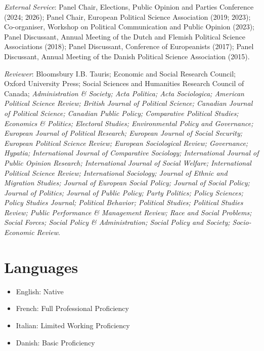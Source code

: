 \documentclass[letterpaper,fontsize=10.5pt]{scrartcl}
\begin{document}
\hfill \break
{}
{}\textit{External Service}: Panel Chair, Elections, Public Opinion and Parties Conference (2024; 2026); Panel Chair, European Political Science Association (2019; 2023); Co-organiser, Workshop on Political Communication and Public Opinion (2023); Panel Discussant, Annual Meeting of the Dutch and Flemish Political Science Associations (2018); Panel Discussant, Conference of Europeanists (2017); Panel Discussant, Annual Meeting of the Danish Political Science Association (2015).\\
\hfill \break
{}
{}\textit{Reviewer}: Bloomsbury I.B. Tauris; Economic and Social Research Council; Oxford University Press; Social Sciences and Humanities Research Council of Canada; \textit{Administration \& Society; Acta Politica; Acta Sociologica; American Political Science Review; British Journal of Political Science; Canadian Journal of Political Science; Canadian Public Policy; Comparative Political Studies; Economics \& Politics; Electoral Studies; Environmental Policy and Governance; European Journal of Political Research; European Journal of Social Security; European Political Science Review; European Sociological Review; Governance; Hypatia; International Journal of Comparative Sociology; International Journal of Public Opinion Research; International Journal of Social Welfare; International Political Science Review; International Sociology; Journal of Ethnic and Migration Studies; Journal of European Social Policy; Journal of Social Policy; Journal of Politics; Journal of Public Policy; Party Politics; Policy Sciences; Policy Studies Journal; Political Behavior; Political Studies; Political Studies Review; Public Performance \& Management Review; Race and Social Problems; Social Forces; Social Policy \& Administration; Social Policy and Society; Socio-Economic Review}.

\section{Languages}
\begin{itemize}[itemsep=0em, topsep=0em, partopsep=0em]
	\item English: Native
	\item French: Full Professional Proficiency
	\item Italian: Limited Working Proficiency
	\item Danish: Basic Proficiency\\
\end{itemize}
\end{document}
